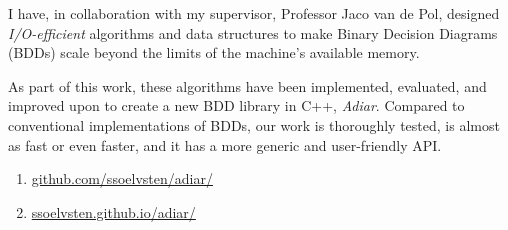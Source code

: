 
I have, in collaboration with my supervisor, Professor Jaco van de Pol, designed
\emph{I/O-efficient} algorithms and data structures to make Binary Decision Diagrams (BDDs) scale
beyond the limits of the machine's available memory.

\medskip

As part of this work, these algorithms have been implemented, evaluated, and improved upon to create
a new BDD library in C++, \emph{Adiar}. Compared to conventional implementations of BDDs, our work
is thoroughly tested, is almost as fast or even faster, and it has a more generic and user-friendly
API.

\medskip

\begin{enumerate}[leftmargin=2.5em]
\item[\indent\faGit] \href{https://github.com/ssoelvsten/adiar/}{github.com/ssoelvsten/adiar/}

\item[\indent\faFileTextO] \href{https://ssoelvsten.github.io/adiar/}{ssoelvsten.github.io/adiar/}
\end{enumerate}

\medskip
